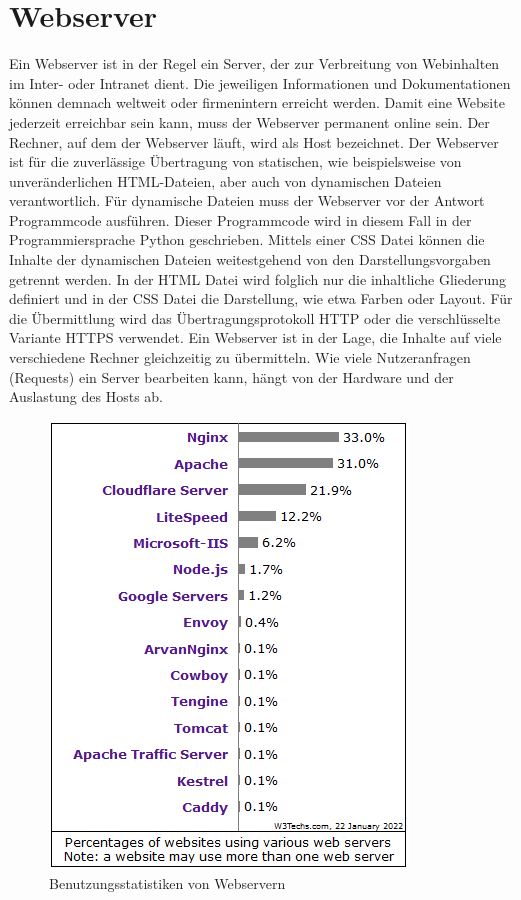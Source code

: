 \section{Webserver}
Ein Webserver ist in der Regel ein Server, der zur Verbreitung von Webinhalten im Inter- oder Intranet dient. Die jeweiligen Informationen und Dokumentationen können demnach weltweit oder firmenintern erreicht werden. Damit eine Website jederzeit erreichbar sein kann, muss der Webserver permanent online sein.
Der Rechner, auf dem der Webserver läuft, wird als Host bezeichnet. Der Webserver ist für die zuverlässige Übertragung von statischen, wie beispielsweise von unveränderlichen \ac{HTML}-Dateien, aber auch von dynamischen Dateien verantwortlich. Für dynamische Dateien muss der Webserver vor der Antwort Programmcode ausführen. Dieser Programmcode wird in diesem Fall in der Programmiersprache Python geschrieben. Mittels einer \ac{CSS} Datei können die Inhalte der dynamischen Dateien weitestgehend von den Darstellungsvorgaben getrennt werden. In der \ac{HTML} Datei wird folglich nur die inhaltliche Gliederung definiert und in der \ac{CSS} Datei die Darstellung, wie etwa Farben oder Layout.
Für die Übermittlung wird das Übertragungsprotokoll \ac{HTTP} oder die verschlüsselte Variante \ac{HTTPS} verwendet.
Ein Webserver ist in der Lage, die Inhalte auf viele verschiedene Rechner gleichzeitig zu übermitteln. Wie viele Nutzeranfragen (Requests) ein Server bearbeiten kann, hängt von der Hardware und der Auslastung des Hosts ab.

\begin{figure}[htbp]
	\centering
	\includegraphics{images/StatistikWebserver.png}
	\caption{Benutzungsstatistiken von Webservern \cite{w3techs}}
	\label{fig:WebserverStatistik}
\end{figure}

